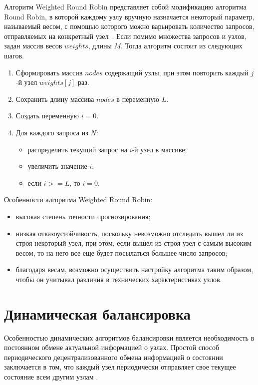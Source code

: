 Алгоритм Weighted Round Robin представляет собой модификацию алгоритма Round Robin, в которой каждому узлу вручную назначается некоторый параметр, называемый весом, с помощью которого можно варьировать количество запросов, отправляемых на конкретный узел~\cite{part_algos}. Если помимо множества запросов и узлов, задан массив весов $weights$, длины $M$. Тогда алгоритм состоит из следующих шагов.
\begin{enumerate}
	\item Сформировать массив $nodes$ содержащий узлы, при этом повторить каждый $j$-й узел $weights[j]$ раз.
	\item Сохранить длину массива $nodes$ в переменную $L$.
	\item Создать переменную $i = 0$.
	\item Для каждого запроса из $N$:
	\begin{itemize}
		\item распределить текущий запрос на $i$-й узел в массиве;
		\item увеличить значение $i$;
		\item если $i >= L$, то $i = 0$.
	\end{itemize}	
\end{enumerate}


Особенности алгоритма Weighted Round Robin:
\begin{itemize}
	\item высокая степень точности прогнозирования;
	\item низкая отказоустойчивость, поскольку невозможно отследить вышел ли из строя некоторый узел, при этом, если вышел из строя узел с самым высоким весом, то на него все еще будет посылаться большее число запросов;
	\item благодаря весам, возможно осуществить настройку алгоритма таким образом, чтобы он учитывал различия в технических характеристиках узлов.
\end{itemize}



\section{Динамическая балансировка}

Особенностью динамических алгоритмов балансировки является необходимость в постоянном обмене актуальной информацией о узлах.
Простой способ периодического децентрализованного обмена информацией о состоянии заключается в том, что каждый узел периодически отправляет свое текущее состояние всем другим узлам \cite{drr}.

